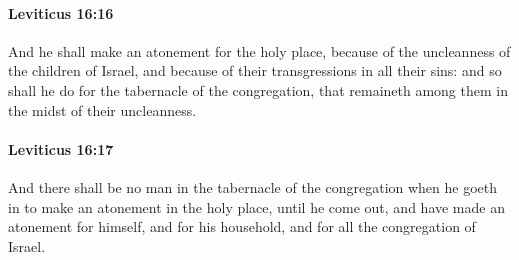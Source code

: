 		\paragraph{Leviticus 16:16} %
			\label{LEVITICUS-16-16}

			And he shall make an atonement for the holy place, because of the uncleanness of the children of Israel, and because of their transgressions in all their sins: and so shall he do for the tabernacle of the congregation, that remaineth among them in the midst of their uncleanness.


		\paragraph{Leviticus 16:17} %
			\label{LEVITICUS-16-17}

			And there shall be no man in the tabernacle of the congregation when he goeth in to make an atonement in the holy place, until he come out, and have made an atonement for himself, and for his household, and for all the congregation of Israel.

